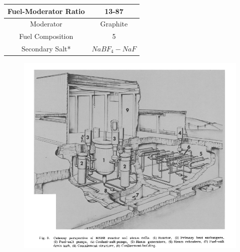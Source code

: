 \documentclass[letterpaper]{article}
\begin{document}
\begin{center}
\begin{tabular}{|c|c|}
\hline
Fuel-Moderator Ratio & 13-87 \\
\hline
Moderator & Graphite \\
\hline
Fuel Composition & 5 \\
\hline
Secondary Salt* & $NaBF_4-NaF$ \\
\hline
\end{tabular}
\end{center}

\begin{figure}[H]
  \centering
  \includegraphics[width=1.0\linewidth]{figures/MSBRsource1.png}
  \label{fig:fig3}
\end{figure}
\end{document}
